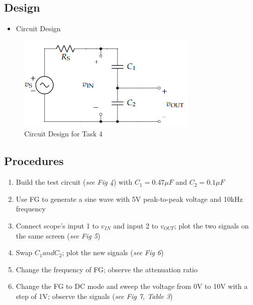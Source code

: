\documentclass[journal, letterpaper]{IEEEtran}
\begin{document}
    \subsection{Design}
    \begin{itemize}
    \item Circuit Design
    \end{itemize}
    \begin{figure}[!hbt]
    	\begin{center}
    		\includegraphics[width=\columnwidth]{l7_3}
            \caption{Circuit Design for Task 4}
            \label{fig:l7_4}
    	\end{center}
    \end{figure}
	\subsection{Procedures}
    \begin{enumerate}
    \item Build the test circuit (\textit{see Fig 4}) with $C_1 = 0.47\mu F $ and $ C_2 = 0.1\mu F$
    \item Use FG to generate a sine wave with 5V peak-to-peak voltage and 10kHz frequency
    \item Connect scope's input 1 to $v_{IN}$ and input 2 to $v_{OUT}$; plot the two signals on the same screen (\textit{see Fig 5})
    \item Swap $C_1 and C_2$; plot the new signals (\textit{see Fig 6})
    \item Change the frequency of FG; observe the attenuation ratio
    \item Change the FG to DC mode and sweep the voltage from 0V to 10V with a step of 1V; observe the signals (\textit{see Fig 7, Table 3})
    \end{enumerate}
\end{document}
